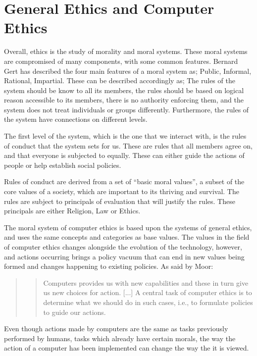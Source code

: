 \chapter{General Ethics and Computer Ethics}

Overall, ethics is the study of morality and moral systems. These moral systems are compromised of many components, with some common features. Bernard Gert has described the four main features of a moral system as; Public, Informal, Rational, Impartial. \cite{stanford:morality} These can be described accordingly as; The rules of the system should be know to all its members, the rules should be based on logical reason accessible to its members, there is no authority enforcing them, and the system does not treat individuals or groups differently. Furthermore, the rules of the system have connections on different levels. 

\newpar The first level of the system, which is the one that we interact with, is the rules of conduct that the system sets for us. These are rules that all members agree on, and that everyone is subjected to equally.  These can either guide the actions of people or help establish social policies. 

Rules of conduct are derived from a set of “basic moral values”, a subset of the core values of a society, which are important to its thriving and survival. The rules are subject to principals of evaluation that will justify the rules. These principals are either Religion, Law or Ethics. \cite{tavani2011ethics}

\newpar The moral system of computer ethics is based upon the systems of general ethics, and uses the same concepts and categories as base values. The values in the field of computer ethics changes alongside the evolution of the technology, however, and actions occurring brings a policy vacuum that can end in new values being formed and changes happening to existing policies. As said by Moor: 

\begin{quote}
	\blockquote{Computers provides us with new capabilities and these in turn give us new choices for action. [...] A central task of computer ethics is to determine what we should do in such cases, i.e., to formulate policies to guide our actions.}\cite{moor1985computer}
\end{quote}


\noindent Even though actions made by computers are the same as tasks previously performed by humans, tasks which already have certain morals, the way the action of a computer has been implemented can change the way the it is viewed. 

